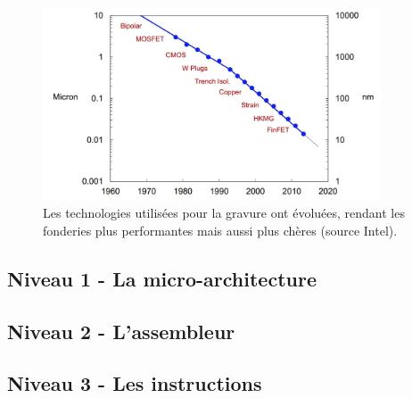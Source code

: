 \begin{figure}
    \center
    \includegraphics[width=10cm]{images/processeurs_porte_fondeurs.png}
    \caption{\label{processeurs_porte_fondeurs} Les technologies utilisées pour la gravure ont évoluées, rendant les fonderies plus performantes mais aussi plus chères (source Intel).}
\end{figure}












\subsection{Niveau 1 - La micro-architecture}







\subsection{Niveau 2 - L'assembleur}





\subsection{Niveau 3 - Les instructions}






